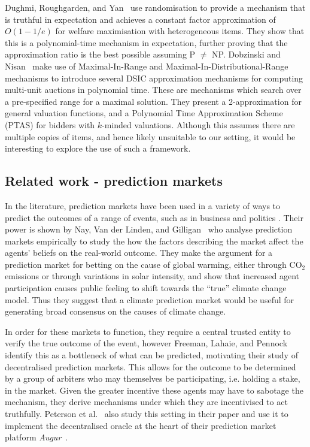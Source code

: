 \documentclass[10pt,a4paper]{article}
\theoremstyle{plain}
\theoremstyle{definition}
\begin{document}
	Dughmi, Roughgarden, and Yan~\cite{Dughmi2016} use randomisation to provide
	a mechanism that is truthful in expectation and achieves a constant factor
	approximation of $O(1-1/e)$ for welfare maximisation with heterogeneous
	items. They show that this is a polynomial-time mechanism in expectation,
	further proving that the approximation ratio is the best possible assuming
	P $\neq$ NP. Dobzinski and Nisan~\cite{Dobzinski2010} make use of
	Maximal-In-Range and Maximal-In-Distributional-Range~\cite{Dobzinski2006}
	mechanisms to introduce several DSIC approximation mechanisms for computing
	multi-unit auctions in polynomial time. These are mechanisms which search
	over a pre-specified range for a maximal solution. They present a
	2-approximation for general valuation functions, and a Polynomial Time
	Approximation Scheme (PTAS) for bidders with $k$-minded valuations.
	Although this assumes there are multiple copies of items, and hence likely
	unsuitable to our setting, it would be interesting to explore the use of
	such a framework.

	\subsection{Related work - prediction markets}

	In the literature, prediction markets have been used in a variety of ways
	to predict the outcomes of a range of events, such as in business and
	politics \cite{Spann2003, Berg2006}. Their power is shown by Nay, Van der
	Linden, and Gilligan~\cite{Nay2016} who analyse prediction markets
	empirically to study the how the factors describing the market affect the
	agents' beliefs on the real-world outcome. They make the argument for a
	prediction market for betting on the cause of global warming, either
	through CO$_2$ emissions or through variations in solar intensity, and show
	that increased agent participation causes public feeling to shift towards
	the ``true'' climate change model. Thus they suggest that a climate
	prediction market would be useful for generating broad consensus on the
	causes of climate change.

	In order for these markets to function, they require a central trusted
	entity to verify the true outcome of the event, however Freeman, Lahaie,
	and Pennock~\cite{Freeman2017} identify this as a bottleneck of what can be
	predicted, motivating their study of decentralised prediction markets. This
	allows for the outcome to be determined by a group of arbiters who may
	themselves be participating, i.e. holding a stake, in the market. Given
	the greater incentive these agents may have to sabotage the mechanism, they
	derive mechanisms under which they are incentivised to act truthfully.
	Peterson et al.~\cite{Peterson2015} also study this setting in their paper
	and use it to implement the decentralised oracle at the heart of their
	prediction market platform \emph{Augur}~\cite{Augur}.
\end{document}
